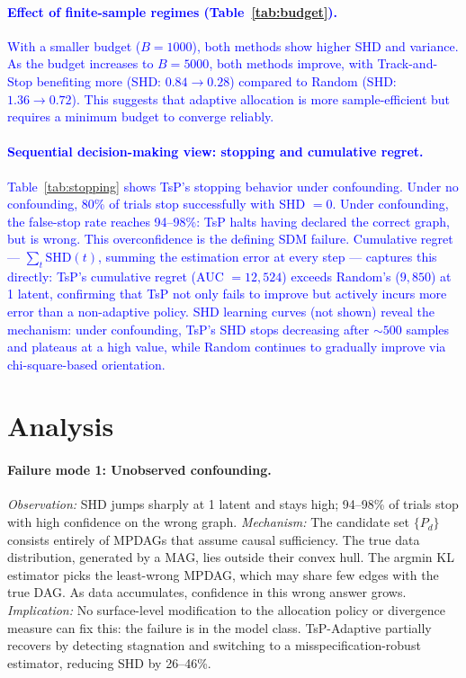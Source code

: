 \documentclass{article}
\newcommand{\added}[1]{\textcolor{blue}{#1}}
\begin{document}
\added{\paragraph{Effect of finite-sample regimes (Table~\ref{tab:budget}).}
With a smaller budget ($B=1000$), both methods show higher SHD and variance. As the budget increases to $B=5000$, both methods improve, with Track-and-Stop benefiting more (SHD: $0.84 \to 0.28$) compared to Random (SHD: $1.36 \to 0.72$). This suggests that adaptive allocation is more sample-efficient but requires a minimum budget to converge reliably.}

\added{\paragraph{Sequential decision-making view: stopping and cumulative regret.}
Table~\ref{tab:stopping} shows TsP's stopping behavior under confounding. Under no confounding, 80\% of trials stop successfully with SHD $= 0$. Under confounding, the false-stop rate reaches 94--98\%: TsP halts having declared the correct graph, but is wrong. This overconfidence is the defining SDM failure. Cumulative regret — $\sum_t \text{SHD}(t)$, summing the estimation error at every step — captures this directly: TsP's cumulative regret (AUC $= 12{,}524$) exceeds Random's ($9{,}850$) at 1 latent, confirming that TsP not only fails to improve but actively incurs more error than a non-adaptive policy. SHD learning curves (not shown) reveal the mechanism: under confounding, TsP's SHD stops decreasing after $\sim 500$ samples and plateaus at a high value, while Random continues to gradually improve via chi-square-based orientation.}

\section{Analysis}
\paragraph{Failure mode 1: Unobserved confounding.}
\emph{Observation:} SHD jumps sharply at 1 latent and stays high; 94--98\% of trials stop with high confidence on the wrong graph.
\emph{Mechanism:} The candidate set $\{P_d\}$ consists entirely of MPDAGs that assume causal sufficiency. The true data distribution, generated by a MAG, lies outside their convex hull. The argmin KL estimator picks the least-wrong MPDAG, which may share few edges with the true DAG. As data accumulates, confidence in this wrong answer grows.
\emph{Implication:} No surface-level modification to the allocation policy or divergence measure can fix this: the failure is in the model class. TsP-Adaptive partially recovers by detecting stagnation and switching to a misspecification-robust estimator, reducing SHD by 26--46\%.
\end{document}
